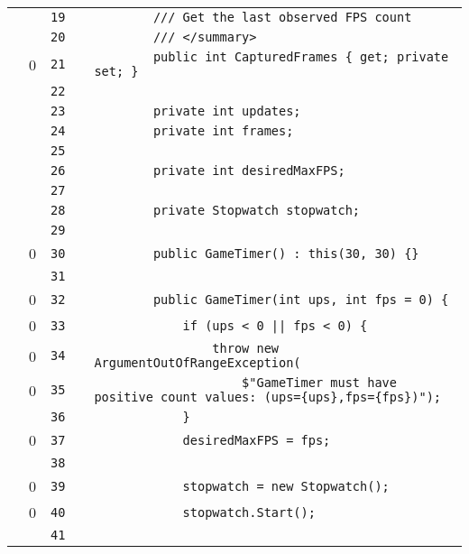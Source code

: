 \documentclass[a4paper,landscape,10pt]{article}
\begin{document}
\begin{longtable}[l]{lrrll}
\cellcolor{gray} &  & \verb~19~ & & \verb~        /// Get the last observed FPS count~\\
\cellcolor{gray} &  & \verb~20~ & & \verb~        /// </summary>~\\
\cellcolor{red} & 0 & \verb~21~ & & \verb~        public int CapturedFrames { get; private set; }~\\
\cellcolor{gray} &  & \verb~22~ & & \verb~~\\
\cellcolor{gray} &  & \verb~23~ & & \verb~        private int updates;~\\
\cellcolor{gray} &  & \verb~24~ & & \verb~        private int frames;~\\
\cellcolor{gray} &  & \verb~25~ & & \verb~~\\
\cellcolor{gray} &  & \verb~26~ & & \verb~        private int desiredMaxFPS;~\\
\cellcolor{gray} &  & \verb~27~ & & \verb~~\\
\cellcolor{gray} &  & \verb~28~ & & \verb~        private Stopwatch stopwatch;~\\
\cellcolor{gray} &  & \verb~29~ & & \verb~~\\
\cellcolor{red} & 0 & \verb~30~ & & \verb~        public GameTimer() : this(30, 30) {}~\\
\cellcolor{gray} &  & \verb~31~ & & \verb~~\\
\cellcolor{red} & 0 & \verb~32~ & & \verb~        public GameTimer(int ups, int fps = 0) {~\\
\cellcolor{red} & 0 & \verb~33~ & & \verb~            if (ups < 0 || fps < 0) {~\\
\cellcolor{red} & 0 & \verb~34~ & & \verb~                throw new ArgumentOutOfRangeException(~\\
\cellcolor{red} & 0 & \verb~35~ & & \verb~                    $"GameTimer must have positive count values: (ups={ups},fps={fps})");~\\
\cellcolor{gray} &  & \verb~36~ & & \verb~            }~\\
\cellcolor{red} & 0 & \verb~37~ & & \verb~            desiredMaxFPS = fps;~\\
\cellcolor{gray} &  & \verb~38~ & & \verb~~\\
\cellcolor{red} & 0 & \verb~39~ & & \verb~            stopwatch = new Stopwatch();~\\
\cellcolor{red} & 0 & \verb~40~ & & \verb~            stopwatch.Start();~\\
\cellcolor{gray} &  & \verb~41~ & & \verb~~\\

\end{longtable}
\end{document}
